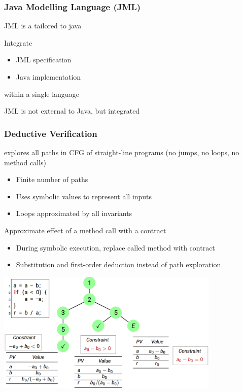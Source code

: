 \documentclass[
    ../../Software_Engineering_Summary.tex,
]
{subfiles}
\begin{document}
\begin{samepage}
\subsubsection{Java Modelling Language (JML)}
JML is a  tailored to java

\begin{defbox}
    Integrate
    \begin{itemize}
        \item JML specification
        \item Java implementation
    \end{itemize}
    within a single language
\end{defbox}

JML is not external to Java, but integrated
\end{samepage}
\begin{samepage}
\subsubsection{Deductive Verification}
\begin{defbox}
     explores all paths in CFG of straight-line programs (no jumps, no loops, no method calls)
    \begin{itemize}
        \item Finite number of paths
        \item Uses symbolic values to represent all inputs
        \item Loops approximated by all invariants
    \end{itemize}
\end{defbox}
\end{samepage}
\begin{defbox}
    Approximate effect of a method call with a contract
    \begin{itemize}
        \item During symbolic execution, replace called method with contract
        \item Substitution and first-order deduction instead of path exploration
    \end{itemize}
\end{defbox}

\begin{defbox}
    \centering
    \includegraphics[width=0.8\textwidth]{Pics/11/SymbolicExecution.png}
\end{defbox}
\end{document}
